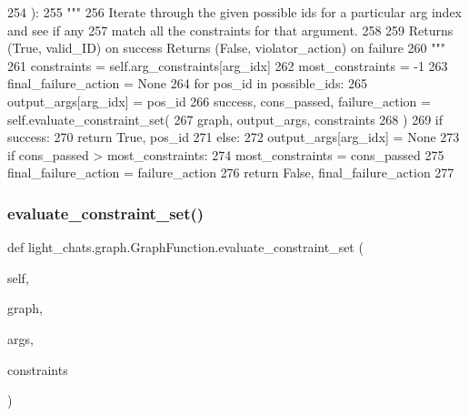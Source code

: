 \begin{DoxyCode}
254     ):
255         \textcolor{stringliteral}{"""}
256 \textcolor{stringliteral}{        Iterate through the given possible ids for a particular arg index and see if any}
257 \textcolor{stringliteral}{        match all the constraints for that argument.}
258 \textcolor{stringliteral}{}
259 \textcolor{stringliteral}{        Returns (True, valid\_ID) on success Returns (False, violator\_action) on failure}
260 \textcolor{stringliteral}{        """}
261         constraints = self.arg\_constraints[arg\_idx]
262         most\_constraints = -1
263         final\_failure\_action = \textcolor{keywordtype}{None}
264         \textcolor{keywordflow}{for} pos\_id \textcolor{keywordflow}{in} possible\_ids:
265             output\_args[arg\_idx] = pos\_id
266             success, cons\_passed, failure\_action = self.evaluate\_constraint\_set(
267                 graph, output\_args, constraints
268             )
269             \textcolor{keywordflow}{if} success:
270                 \textcolor{keywordflow}{return} \textcolor{keyword}{True}, pos\_id
271             \textcolor{keywordflow}{else}:
272                 output\_args[arg\_idx] = \textcolor{keywordtype}{None}
273                 \textcolor{keywordflow}{if} cons\_passed > most\_constraints:
274                     most\_constraints = cons\_passed
275                     final\_failure\_action = failure\_action
276         \textcolor{keywordflow}{return} \textcolor{keyword}{False}, final\_failure\_action
277 
\end{DoxyCode}
\mbox{\label{classlight__chats_1_1graph_1_1GraphFunction_a2110ae09489d9ebc9291a1fd39d8c4cd}} 
\subsubsection{\texorpdfstring{evaluate\+\_\+constraint\+\_\+set()}{evaluate\_constraint\_set()}}
{\footnotesize\ttfamily def light\+\_\+chats.\+graph.\+Graph\+Function.\+evaluate\+\_\+constraint\+\_\+set (\begin{DoxyParamCaption}\item[{}]{self,  }\item[{}]{graph,  }\item[{}]{args,  }\item[{}]{constraints }\end{DoxyParamCaption})}

